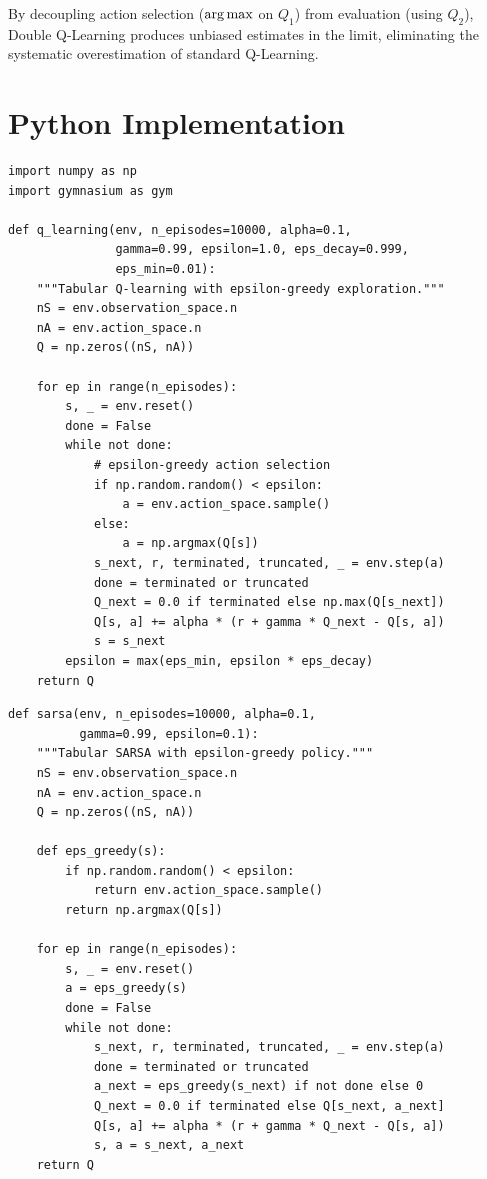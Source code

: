 \begin{proposition}
By decoupling action selection ($\operatorname*{arg\,max}$ on $Q_1$) from evaluation
(using $Q_2$), Double Q-Learning produces unbiased estimates in the limit,
eliminating the systematic overestimation of standard Q-Learning.
\end{proposition}

\section{Python Implementation}
\label{sec:q_impl}

\begin{codeblock}[title=\textbf{Q-Learning Implementation}]
\begin{verbatim}
import numpy as np
import gymnasium as gym

def q_learning(env, n_episodes=10000, alpha=0.1,
               gamma=0.99, epsilon=1.0, eps_decay=0.999,
               eps_min=0.01):
    """Tabular Q-learning with epsilon-greedy exploration."""
    nS = env.observation_space.n
    nA = env.action_space.n
    Q = np.zeros((nS, nA))

    for ep in range(n_episodes):
        s, _ = env.reset()
        done = False
        while not done:
            # epsilon-greedy action selection
            if np.random.random() < epsilon:
                a = env.action_space.sample()
            else:
                a = np.argmax(Q[s])
            s_next, r, terminated, truncated, _ = env.step(a)
            done = terminated or truncated
            Q_next = 0.0 if terminated else np.max(Q[s_next])
            Q[s, a] += alpha * (r + gamma * Q_next - Q[s, a])
            s = s_next
        epsilon = max(eps_min, epsilon * eps_decay)
    return Q
\end{verbatim}
\end{codeblock}

\begin{codeblock}[title=\textbf{SARSA Implementation}]
\begin{verbatim}
def sarsa(env, n_episodes=10000, alpha=0.1,
          gamma=0.99, epsilon=0.1):
    """Tabular SARSA with epsilon-greedy policy."""
    nS = env.observation_space.n
    nA = env.action_space.n
    Q = np.zeros((nS, nA))

    def eps_greedy(s):
        if np.random.random() < epsilon:
            return env.action_space.sample()
        return np.argmax(Q[s])

    for ep in range(n_episodes):
        s, _ = env.reset()
        a = eps_greedy(s)
        done = False
        while not done:
            s_next, r, terminated, truncated, _ = env.step(a)
            done = terminated or truncated
            a_next = eps_greedy(s_next) if not done else 0
            Q_next = 0.0 if terminated else Q[s_next, a_next]
            Q[s, a] += alpha * (r + gamma * Q_next - Q[s, a])
            s, a = s_next, a_next
    return Q
\end{verbatim}
\end{codeblock}

